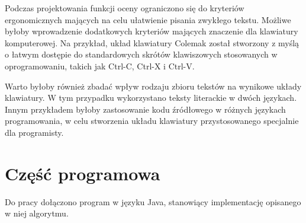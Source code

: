 \documentclass[brudnopis]{xmgr}
\begin{document}
Podczas projektowania funkcji oceny ograniczono się do kryteriów ergonomicznych mających na celu ułatwienie pisania zwykłego tekstu. Możliwe byłoby wprowadzenie dodatkowych kryteriów mających znaczenie dla klawiatury komputerowej. Na przykład, układ klawiatury Colemak został stworzony z myślą o łatwym dostępie do standardowych skrótów klawiszowych stosowanych w oprogramowaniu, takich jak Ctrl-C, Ctrl-X i Ctrl-V.

Warto byłoby również zbadać wpływ rodzaju zbioru tekstów na wynikowe układy klawiatury. W tym przypadku wykorzystano teksty literackie w dwóch językach. Innym przykładem byłoby zastosowanie kodu źródłowego w różnych językach programowania, w celu stworzenia układu klawiatury przystosowanego specjalnie dla programisty.


\appendix
\chapter{Część programowa}

Do pracy dołączono program w języku Java, stanowiący implementację opisanego w niej algorytmu.





\listoffigures

\oswiadczenie
\end{document}
